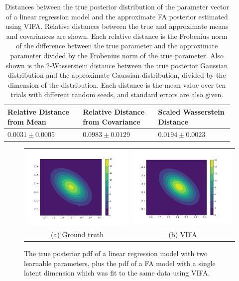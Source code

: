 \documentclass[msc,deptreport.inf]{infthesis} %
\begin{document}
\begin{table}[h!]
	\begin{center}
		\begin{tabular}{|| p{0.3\linewidth} p{0.3\linewidth} p{0.3\linewidth} ||} 
 			\hline
 			Relative Distance from Mean & Relative Distance from Covariance & Scaled Wasserstein Distance \\ [0.5ex] 
 			\hline\hline
			$0.0031 \pm 0.0005$ 	& $0.0983 \pm 0.0129$ 	& $0.0194 \pm 0.0023$ \\ [1ex] 
			\hline
		\end{tabular}
		\caption{Distances between the true posterior distribution of the parameter vector of a linear regression model and the approximate FA posterior estimated using VIFA. Relative distances between the true and approximate means and covariances are shown. Each relative distance is the Frobenius norm of the difference between the true parameter and the approximate parameter divided by the Frobenius norm of the true parameter. Also shown is the 2-Wasserstein distance between the true posterior Gaussian distribution and the approximate Gaussian distribution, divided by the dimension of the distribution. Each distance is the mean value over ten trials with different random seeds, and standard errors are also given.}
		\label{table:linear_regression_vi_posterior}
	\end{center}
\end{table}

\begin{figure}[!htbp] 
	\begin{tabular}{cc}
		 \includegraphics[width=70mm]{plots/linear_model_true_posterior__alpha=0.01__beta=0.1.png}
		 & \includegraphics[width=70mm]{plots/linear_model_vi_posterior__alpha=0.01__beta=0.1__latent_dim=1.png} \\
		 (a) Ground truth
		 & (b) VIFA \\[6pt]
	\end{tabular}
	\caption{The true posterior pdf of a linear regression model with two learnable parameters, plus the pdf of a FA model with a single latent dimension which was fit to the same data using VIFA.}
	\label{fig:linear_regression_vi_posterior}
\end{figure}
\end{document}
